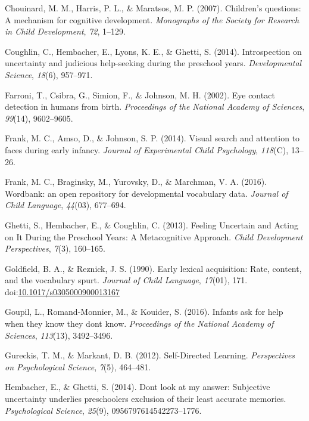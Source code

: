 \documentclass[english,,man]{apa6}
\begin{document}
\hypertarget{ref-Chouinard2007}{}
Chouinard, M. M., Harris, P. L., \& Maratsos, M. P. (2007). Children's
questions: A mechanism for cognitive development. \emph{Monographs of
the Society for Research in Child Development}, \emph{72}, 1--129.

\hypertarget{ref-Coughlin2014}{}
Coughlin, C., Hembacher, E., Lyons, K. E., \& Ghetti, S. (2014).
Introspection on uncertainty and judicious help-seeking during the
preschool years. \emph{Developmental Science}, \emph{18}(6), 957--971.

\hypertarget{ref-Farroni2002}{}
Farroni, T., Csibra, G., Simion, F., \& Johnson, M. H. (2002). Eye
contact detection in humans from birth. \emph{Proceedings of the
National Academy of Sciences}, \emph{99}(14), 9602--9605.

\hypertarget{ref-Frank2014}{}
Frank, M. C., Amso, D., \& Johnson, S. P. (2014). Visual search and
attention to faces during early infancy. \emph{Journal of Experimental
Child Psychology}, \emph{118}(C), 13--26.

\hypertarget{ref-Frank2016}{}
Frank, M. C., Braginsky, M., Yurovsky, D., \& Marchman, V. A. (2016).
Wordbank: an open repository for developmental vocabulary data.
\emph{Journal of Child Language}, \emph{44}(03), 677--694.

\hypertarget{ref-Ghetti2013}{}
Ghetti, S., Hembacher, E., \& Coughlin, C. (2013). Feeling Uncertain and
Acting on It During the Preschool Years: A Metacognitive Approach.
\emph{Child Development Perspectives}, \emph{7}(3), 160--165.

\hypertarget{ref-Goldfield1990}{}
Goldfield, B. A., \& Reznick, J. S. (1990). Early lexical acquisition:
Rate, content, and the vocabulary spurt. \emph{Journal of Child
Language}, \emph{17}(01), 171.
doi:\href{https://doi.org/10.1017/s0305000900013167}{10.1017/s0305000900013167}

\hypertarget{ref-Goupil2016}{}
Goupil, L., Romand-Monnier, M., \& Kouider, S. (2016). Infants ask for
help when they know they dont know. \emph{Proceedings of the National
Academy of Sciences}, \emph{113}(13), 3492--3496.

\hypertarget{ref-Gureckis2012}{}
Gureckis, T. M., \& Markant, D. B. (2012). Self-Directed Learning.
\emph{Perspectives on Psychological Science}, \emph{7}(5), 464--481.

\hypertarget{ref-Hembacher2014}{}
Hembacher, E., \& Ghetti, S. (2014). Dont look at my answer: Subjective
uncertainty underlies preschoolers exclusion of their least accurate
memories. \emph{Psychological Science}, \emph{25}(9),
0956797614542273--1776.
\end{document}
